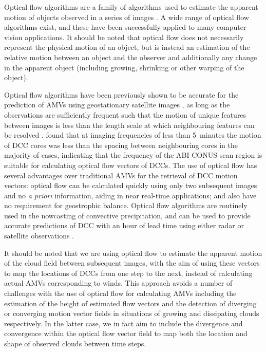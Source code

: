 Optical flow algorithms are a family of algorithms used to estimate the apparent motion of objects observed in a series of images \citep{aggarwal_computation_1988}. 
A wide range of optical flow algorithms exist, and these have been successfully applied to many computer vision applications. 
It should be noted that optical flow does not necessarily represent the physical motion of an object, but is instead an estimation of the relative motion between an object and the observer and additionally any change in the apparent object (including growing, shrinking or other warping of the object). 

Optical flow algorithms have been previously shown to be accurate for the prediction of AMVs using geostationary satellite images \citep{wu_deriving_2016}, as long as the observations are sufficiently frequent such that the motion of unique features between images is less than the length scale at which neighbouring features can be resolved \citep{bresky_feasibility_2006}.
\citet{heikenfeld_tobac_2019} found that at imaging frequencies of less than 5~minutes the motion of DCC cores was less than the spacing between neighbouring cores in the majority of cases, indicating that the frequency of the ABI CONUS scan region is suitable for calculating optical flow vectors of DCCs.
The use of optical flow has several advantages over traditional AMVs for the retrieval of DCC motion vectors: optical flow can be calculated quickly using only two subsequent images and no \textit{a priori} information, aiding in near real-time applications; and also have no requirement for geostrophic balance. 
Optical flow algorithms are routinely used in the nowcasting of convective precipitation, and can be used to provide accurate predictions of DCC with an hour of lead time using either radar or satellite observations \citep[e.g.,][]{bowler_development_2004, bechini_enhanced_2017, woo_operational_2017}.

It should be noted that we are using optical flow to estimate the apparent motion of the cloud field between subsequent images, with the aim of using these vectors to map the locations of DCCs from one step to the next, instead of calculating actual AMVs corresponding to winds.
This approach avoids a number of challenges with the use of optical flow for calculating AMVs including the estimation of the height of estimated flow vectors and the detection of diverging or converging motion vector fields in situations of growing and dissipating clouds respectively.
In the latter case, we in fact aim to include the divergence and convergence within the optical flow vector field to map both the location and shape of observed clouds between time steps.

